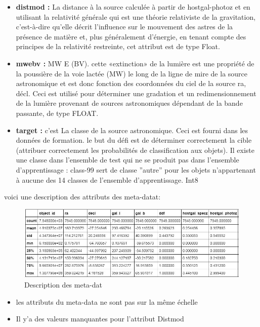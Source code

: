 \begin{itemize}
    \item \textbf{distmod :} La distance à la source calculée à partir de hostgal-photoz et en utilisant la relativité générale qui est une théorie relativiste de la gravitation, c’est-à-dire qu’elle décrit l’influence sur le mouvement des astres de la présence de matière et, plus généralement d’énergie, en tenant compte des principes de la relativité restreinte, cet attribut est de type Float.
    \item\textbf{mwebv :} MW E (BV). cette «extinction» de la lumière est une propriété de la poussière de la voie lactée (MW) le long de la ligne de mire de la source astronomique et est donc fonction des coordonnées du ciel de la source ra, décl. Ceci est utilisé pour déterminer une gradation et un redimensionnement de la lumière provenant de sources astronomiques dépendant de la bande passante, de type FLOAT.
    \item\textbf{target :} c’est La classe de la source astronomique. Ceci est fourni dans les données de formation. le but du défi est de déterminer correctement la cible (attribuer correctement les probabilités de classification aux objets). Il existe une classe dans l’ensemble de test qui ne se produit pas dans l’ensemble d’apprentissage : class-99 sert de classe ”autre” pour les objets n’appartenant à aucune des 14 classes de l’ensemble d’apprentissage. Int8
    \end{itemize}
voici une description des attributs des meta-datat: 

\begin{figure}[!h]
    \centering
    \includegraphics[width=16cm]{report/figures/explore.jpg}
    \caption{Description des meta-dat}
    \label{fig:my_label}
\end{figure}

\begin{itemize}
    \item les attributs du meta-data ne sont pas sur la même échelle
    \item Il y'a des valeurs manquantes pour l'attribut Distmod
\end{itemize}

